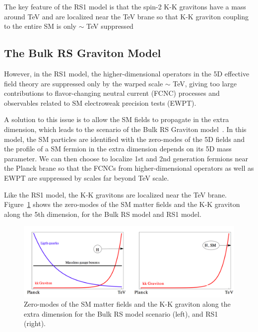 The key feature of the RS1 model is that the spin-2 K-K gravitons have a mass around TeV and are localized near the TeV brane so that K-K graviton coupling to the entire SM is only $\sim$ TeV suppressed
\subsection{The Bulk RS Graviton Model}
However, in the RS1 model, the higher-dimensional operators in the 5D effective field theory are suppressed only by the warped scale $\sim$ TeV, giving too large contributions to flavor-changing neutral current (FCNC) processes and observables related to SM electroweak precision tests (EWPT).

\vspace{0.3cm}
A solution to this issue is to allow the SM fields to propagate in the extra dimension, which leads to the scenario of the Bulk RS Graviton model~\cite{intro_bulkref1,intro_bulkref2,intro_bulkref3}. In this model, the SM particles are identified with the zero-modes of the 5D fields and the profile of a SM fermion in the extra dimension depends on its 5D mass parameter. We can then choose to localize 1st and 2nd generation fermions near the Planck brane so that the FCNCs from higher-dimensional operators as well as EWPT are suppressed by scales far beyond TeV scale.

\vspace{0.3cm}
Like the RS1 model, the K-K gravitons are localized near the TeV brane. Figure~\ref{fig:intro_rsandbulk} shows the zero-modes of the SM matter fields and the K-K graviton along the 5th dimension, for the Bulk RS model and RS1 model.
\begin{figure}[htbp]
\begin{center}
\includegraphics[width=0.9\linewidth]{figures/intro_rsandbulk.png}
\caption{Zero-modes of the SM matter fields and the K-K graviton along the extra dimension for the Bulk RS model scenario (left), and RS1 (right).}
\label{fig:intro_rsandbulk}
\end{center}
\end{figure}

